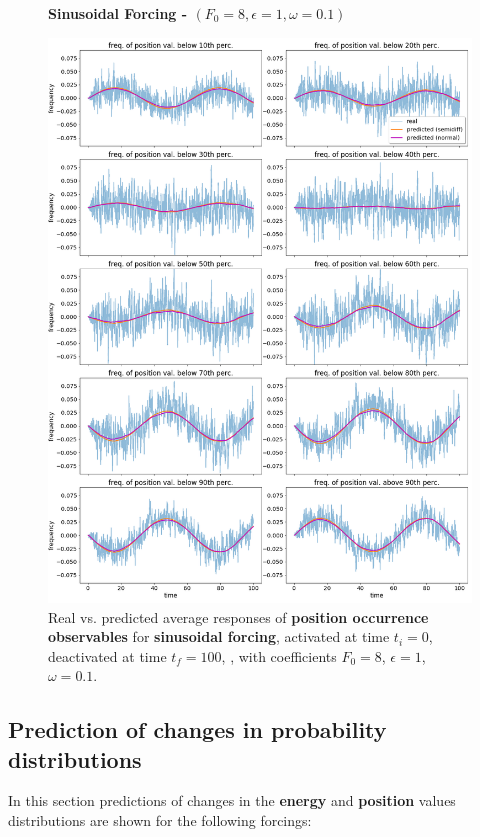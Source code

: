 \documentclass{article}
\begin{document}
\begin{figure}[!h]
	\centering
	\textbf{Sinusoidal Forcing - $(F_0=8, \epsilon=1, \omega=0.1)$}\par\medskip
	\includegraphics[width=0.9\linewidth]{fig/pred_position_below_SinF_8_10_01_0_100.png}
	\caption{Real vs. predicted average responses of \textbf{position occurrence observables} for \textbf{sinusoidal forcing}, activated at time $t_i=0$, deactivated at time $t_f=100$, , with coefficients $F_0 = 8$, $\epsilon = 1$, $\omega = 0.1$.}
	\label{fig:pred_below_SinF_8_10_01_0_100}
\end{figure}

\clearpage

\subsection{Prediction of changes in probability distributions}

In this section predictions of changes in the \textbf{energy} and \textbf{position} values distributions are shown for the following forcings:
\end{document}
